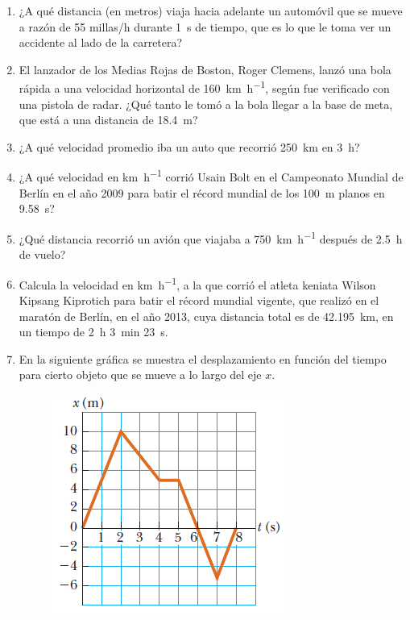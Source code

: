 \documentclass[14pt]{extarticle}
\begin{document}
\begin{enumerate}
\item ¿A qué distancia (en metros) viaja hacia adelante un automóvil que se mueve a razón de 55 millas/h durante \SI{1}{\second} de tiempo, que es lo que le toma ver un accidente al lado de la carretera?
\item El lanzador de los Medias Rojas de Boston, Roger Clemens, lanzó una bola rápida a una velocidad horizontal de \SI{160}{\kilo\meter\per\hour}, según fue verificado con una pistola de radar. ¿Qué tanto le tomó a la bola llegar a la base de meta, que está a una distancia de \SI{18.4}{\meter}?
\item ¿A qué velocidad promedio iba un auto que recorrió \SI{250}{\kilo\meter} en \SI{3}{\hour}?
\item ¿A qué velocidad en \unit{\kilo\meter\per\hour} corrió Usain Bolt en el Campeonato Mundial de Berlín en el año 2009 para batir el récord mundial de los \SI{100}{\meter} planos en \SI{9.58}{\second}?
\item ¿Qué distancia recorrió un avión que viajaba a \SI{750}{\kilo\meter\per\hour} después de \SI{2.5}{\hour} de vuelo?
\item Calcula la velocidad en \unit{\kilo\meter\per\hour}, a la que corrió el atleta keniata Wilson Kipsang Kiprotich para batir el récord mundial vigente, que realizó en el maratón de Berlín, en el año 2013, cuya distancia total es de \SI{42.195}{\kilo\meter}, en un tiempo de \SI{2}{\hour} \SI{3}{\minute} \SI{23}{\second}.
\item En la siguiente gráfica se muestra el desplazamiento en función del tiempo para cierto objeto que se mueve a lo largo del eje $x$.
\begin{figure}[H]
    \centering
    \includegraphics[scale=1]{Imagenes/Ejercicio_Cuenta_01.png}
\end{figure}

\end{enumerate}
\end{document}

